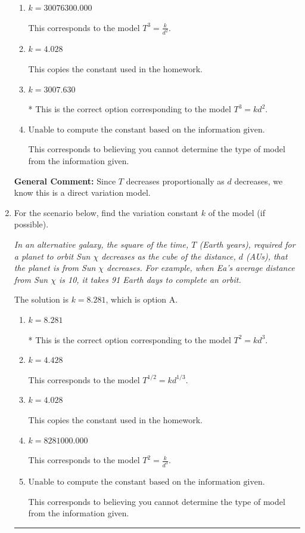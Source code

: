 \documentclass{extbook}[14pt]
\newcommand{\litem}[1]{\item #1

\rule{\textwidth}{0.4pt}}
\begin{document}
\begin{enumerate}
{\begin{enumerate}[label=\Alph*.]
This corresponds to the model $T^{1/3} = k d^{1/2}$.
\item \( k = 30076300.000 \)

This corresponds to the model $T^{3} = \frac{k}{d^{2}}$.
\item \( k = 4.028 \)

This copies the constant used in the homework.
\item \( k = 3007.630 \)

* This is the correct option corresponding to the model $T^{3} = k d^{2}$.
\item \( \text{Unable to compute the constant based on the information given.} \)

This corresponds to believing you cannot determine the type of model from the information given.
\end{enumerate}

\textbf{General Comment:} Since $T$ decreases proportionally as $d$ decreases, we know this is a direct variation model.
}
\litem{
For the scenario below, find the variation constant $k$ of the model (if possible).

\begin{center}
    \textit{ In an alternative galaxy, the square of the time, $T$ (Earth years), required for a planet to orbit Sun $\chi$ decreases as the cube of the distance, $d$ (AUs), that the planet is from Sun $\chi$ decreases. For example, when Ea's average distance from Sun $\chi$ is 10, it takes 91 Earth days to complete an orbit. }
\end{center}
The solution is \( k = 8.281 \), which is option A.\begin{enumerate}[label=\Alph*.]
\item \( k = 8.281 \)

* This is the correct option corresponding to the model $T^{2} = k d^{3}$.
\item \( k = 4.428 \)

This corresponds to the model $T^{1/2} = k d^{1/3}$.
\item \( k = 4.028 \)

This copies the constant used in the homework.
\item \( k = 8281000.000 \)

This corresponds to the model $T^{2} = \frac{k}{d^{3}}$.
\item \( \text{Unable to compute the constant based on the information given.} \)

This corresponds to believing you cannot determine the type of model from the information given.
\end{enumerate}

}
\end{enumerate}
\end{document}
